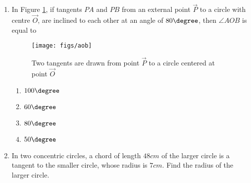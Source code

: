 \begin{enumerate}
\item In Figure \ref{fig:aob1}, if tangents $PA$ and $PB$ from an external point $\vec{P}$ to a circle with centre $\vec{O}$, are inclined to each other at an angle of $80\degree$, then $\angle AOB$ is equal to 
\begin{figure}[H]
\centering
\texttt{[image: figs/aob]}
\caption{Two tangents are drawn from point $\vec{P}$ to a circle centered at point $\vec{O}$}
\label{fig:aob1}
\end{figure}
\begin{enumerate}
\item $100\degree$
\item $60\degree$
\item $80\degree$
\item $50\degree$
\end{enumerate}

\item In two concentric circles, a chord of length $48 cm$ of the larger circle is a tangent to the smaller circle, whose radius is $7 cm$. Find the radius of the larger circle.


\end{enumerate}
